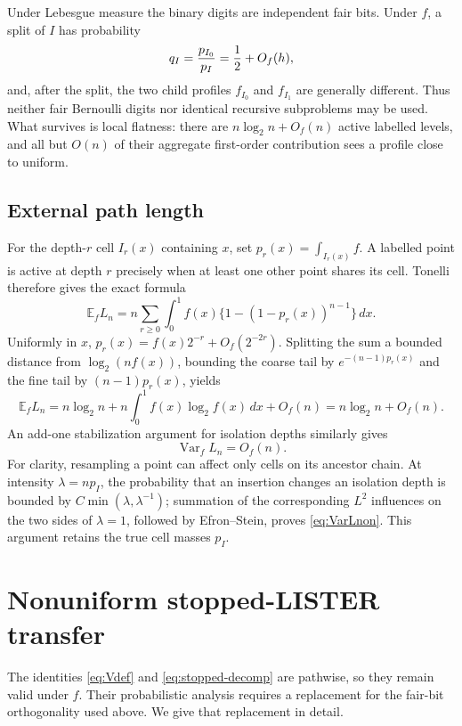 \documentclass[11pt]{article}
\numberwithin{equation}{section}
\theoremstyle{definition}\newtheorem{definition}[theorem]{Definition}
\theoremstyle{remark}\newtheorem{remark}[theorem]{Remark}
\newcommand{\E}{\mathbb E}\newcommand{\Pp}{\mathbb P}
\newcommand{\Var}{\operatorname {Var}}\newcommand{\Cov}{\operatorname {Cov}}
\newcommand{\1}{\mathbf 1}\newcommand{\cD}{\mathcal D}
\begin{document}
Under Lebesgue measure the binary digits are independent fair bits.  Under
$f$, a split of $I$ has probability
\begin{equation}q_I={p_{I_0}\over p_I}={1\over2}+O_f(h), \label{eq:nonfair}
\end{equation}
and, after the split, the two child profiles $f_{I_0}$ and $f_{I_1}$ are
generally different.  Thus neither fair Bernoulli digits nor identical
recursive subproblems may be used.  What survives is local flatness:
there are $n\log_2n+O_f(n)$ active labelled levels, and all but $O(n)$ of
their aggregate first-order contribution sees a profile close to uniform.

\subsection{External path length}
For the depth-$r$ cell $I_r(x)$ containing $x$, set
$p_r(x)=\int_{I_r(x)}f$.  A labelled point is active at depth $r$ precisely
when at least one other point shares its cell.  Tonelli therefore gives the
exact formula
\begin{equation}
 \E_fL_n=n\sum_{r\ge0}\int_0^1 f(x)
       \{1-(1-p_r(x))^{n-1}\}\,dx.                       \label{eq:ELexact}
\end{equation}
Uniformly in $x$,
$p_r(x)=f(x)2^{-r}+O_f(2^{-2r})$.  Splitting the sum a bounded distance
from $\log_2(nf(x))$, bounding the coarse tail by
$e^{-(n-1)p_r(x)}$ and the fine tail by $(n-1)p_r(x)$, yields
\begin{equation}
 \E_fL_n=n\log_2n+n\int_0^1f(x)\log_2f(x)\,dx+O_f(n)
        =n\log_2n+O_f(n).                                 \label{eq:EL}
\end{equation}
An add-one stabilization argument for isolation depths similarly gives
\begin{equation}\Var_fL_n=O_f(n).                          \label{eq:VarLnon}
\end{equation}
For clarity, resampling a point can affect only cells on its ancestor chain.
At intensity $\lambda=n p_I$, the probability that an insertion changes an
isolation depth is bounded by $C\min(\lambda,\lambda^{-1})$; summation of
the corresponding $L^2$ influences on the two sides of $\lambda=1$, followed
by Efron--Stein, proves \eqref{eq:VarLnon}.  This argument retains the true
cell masses $p_I$.

\clearpage
\section{Nonuniform stopped-LISTER transfer}\label{sec:nonuniformlister}
The identities \eqref{eq:Vdef} and \eqref{eq:stopped-decomp} are pathwise,
so they remain valid under $f$.  Their probabilistic analysis requires a
replacement for the fair-bit orthogonality used above.  We give that
replacement in detail.
\end{document}
